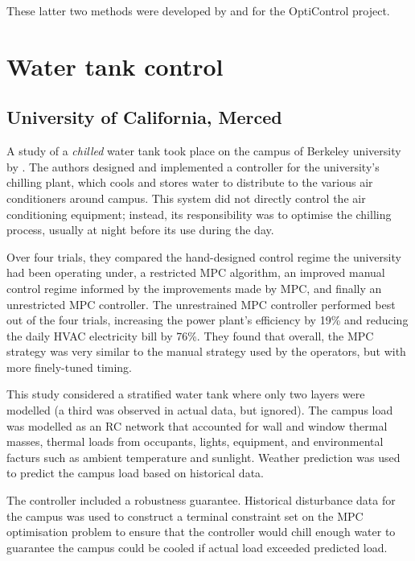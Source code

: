 These latter two methods were developed by and for the OptiControl project.

\section{Water tank control}


\subsection{University of California, Merced}

A study of a {\it chilled} water tank took place on the campus of Berkeley university by \textcite{Ma12}.
The authors designed and implemented a controller for the university's chilling plant, which cools and stores water to distribute to the various air conditioners around campus.
This system did not directly control the air conditioning equipment; instead, its responsibility was to optimise the chilling process, usually at night before its use during the day.

Over four trials, they compared the hand-designed control regime the university had been operating under, a restricted MPC algorithm, an improved manual control regime informed by the improvements made by MPC, and finally an unrestricted MPC controller.
The unrestrained MPC controller performed best out of the four trials, increasing the power plant's efficiency by 19\% and reducing the daily HVAC electricity bill by 76\%.
They found that overall, the MPC strategy was very similar to the manual strategy used by the operators, but with more finely-tuned timing.

This study considered a stratified water tank where only two layers were modelled (a third was observed in actual data, but ignored).
The campus load was modelled as an RC network that accounted for wall and window thermal masses, thermal loads from occupants, lights, equipment, and environmental facturs such as ambient temperature and sunlight.
Weather prediction was used to predict the campus load based on historical data.

The controller included a robustness guarantee.
Historical disturbance data for the campus was used to construct a terminal constraint set on the MPC optimisation problem to ensure that the controller would chill enough water to guarantee the campus could be cooled if actual load exceeded predicted load.

